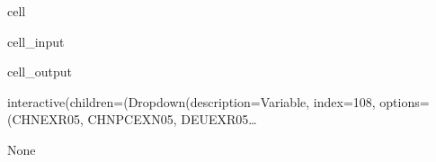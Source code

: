 \documentclass[letterpaper,10pt,english]{jupyterBook}
\begin{document}
\begin{sphinxuseclass}{cell}\begin{sphinxVerbatimInput}

\begin{sphinxuseclass}{cell_input}
\begin{sphinxVerbatim}[commandchars=\\\{\}]
\end{sphinxVerbatim}

\end{sphinxuseclass}\end{sphinxVerbatimInput}
\begin{sphinxVerbatimOutput}

\begin{sphinxuseclass}{cell_output}
\begin{sphinxVerbatim}[commandchars=\\\{\}]
interactive(children=(Dropdown(description=\PYGZsq{}Variable\PYGZsq{}, index=108, options=(\PYGZsq{}CHNEXR05\PYGZsq{}, \PYGZsq{}CHNPCEXN05\PYGZsq{}, \PYGZsq{}DEUEXR05…
\end{sphinxVerbatim}

\begin{sphinxVerbatim}[commandchars=\\\{\}]
None
\end{sphinxVerbatim}

\end{sphinxuseclass}\end{sphinxVerbatimOutput}

\end{sphinxuseclass}
\end{document}
